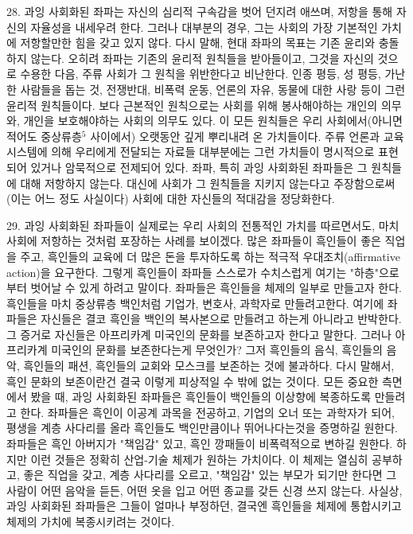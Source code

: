 \documentclass[11pt,a4paper]{article}
\begin{document}
\begin{multicols}{2}
28. 과잉 사회화된 좌파는 자신의 심리적 구속감을 벗어 던지려 애쓰며, 저항을 통해 자신의 자율성을  내세우려 한다. 그러나 대부분의 경우, 그는 사회의 가장 기본적인 가치에 저항할만한 힘을 갖고 있지  않다. 다시 말해, 현대 좌파의 목표는 기존 윤리와 충돌하지 않는다. 오히려 좌파는 기존의 윤리적  원칙들을 받아들이고, 그것을 자신의 것으로 수용한 다음, 주류 사회가 그 원칙을 위반한다고 비난한다.  인종 평등, 성 평등, 가난한 사람들을 돕는 것, 전쟁반대, 비폭력 운동, 언론의 자유, 동물에 대한 사랑 등이 그런 윤리적 원칙들이다. 보다 근본적인 원칙으로는 사회를 위해 봉사해야하는 개인의 의무와,  개인을 보호해야하는 사회의 의무도 있다. 이 모든 원칙들은 우리 사회에서(아니면 적어도 중상류층\hyperlink{5}{$^{5}$} 사이에서) 오랫동안 깊게 뿌리내려 온 가치들이다. 주류 언론과 교육 시스템에 의해 우리에게 전달되는  자료들 대부분에는 그런 가치들이 명시적으로 표현되어 있거나 암묵적으로 전제되어 있다. 좌파, 특히  과잉 사회화된 좌파들은 그 원칙들에 대해 저항하지 않는다. 대신에 사회가 그 원칙들을 지키지 않는다고  주장함으로써(이는 어느 정도 사실이다) 사회에 대한 자신들의 적대감을 정당화한다. 


29. 과잉 사회화된 좌파들이 실제로는 우리 사회의 전통적인 가치를 따르면서도, 마치 사회에 저항하는  것처럼 포장하는 사례를 보이겠다. 많은 좌파들이 흑인들이 좋은 직업을 주고, 흑인들의 교육에 더 많은  돈을 투자하도록 하는 적극적 우대조치(affirmative action)을 요구한다. 그렇게 흑인들이 좌파들  스스로가 수치스럽게 여기는 "하층"으로부터 벗어날 수 있게 하려고 말이다. 좌파들은 흑인들을 체제의  일부로 만들고자 한다. 흑인들을 마치 중상류층 백인처럼 기업가, 변호사, 과학자로 만들려고한다. 여기에 좌파들은 자신들은 결코 흑인을 백인의 복사본으로 만들려고 하는게 아니라고 반박한다. 그 증거로  자신들은 아프리카계 미국인의 문화를 보존하고자 한다고 말한다. 그러나 아프리카계 미국인의 문화를  보존한다는게 무엇인가? 그저 흑인들의 음식, 흑인들의 음악, 흑인들의 패션, 흑인들의 교회와 모스크를  보존하는 것에 불과하다. 다시 말해서, 흑인 문화의 보존이란건 결국 이렇게 피상적일 수 밖에 없는  것이다. 모든 중요한 측면에서 봤을 때, 과잉 사회화된 좌파들은 흑인들이 백인들의 이상향에 복종하도록  만들려고 한다. 좌파들은 흑인이 이공계 과목을 전공하고, 기업의 오너 또는 과학자가 되어, 평생을 계층 사다리를 올라 흑인들도 백인만큼이나 뛰어나다는것을 증명하길 원한다. 좌파들은 흑인 아버지가 "책임감" 있고, 흑인 깡패들이 비폭력적으로 변하길 원한다. 하지만 이런 것들은 정확히 산업-기술 체제가 원하는 가치이다. 이 체제는 열심히 공부하고, 좋은 직업을 갖고, 계층 사다리를 오르고, "책임감" 있는 부모가 되기만 한다면 그 사람이 어떤 음악을 듣든, 어떤 옷을 입고 어떤 종교를 갖든 신경 쓰지 않는다.  사실상, 과잉 사회화된 좌파들은 그들이 얼마나 부정하던, 결국엔 흑인들을 체제에 통합시키고 체제의 가치에 복종시키려는 것이다. 



\end{multicols}
\end{document}
